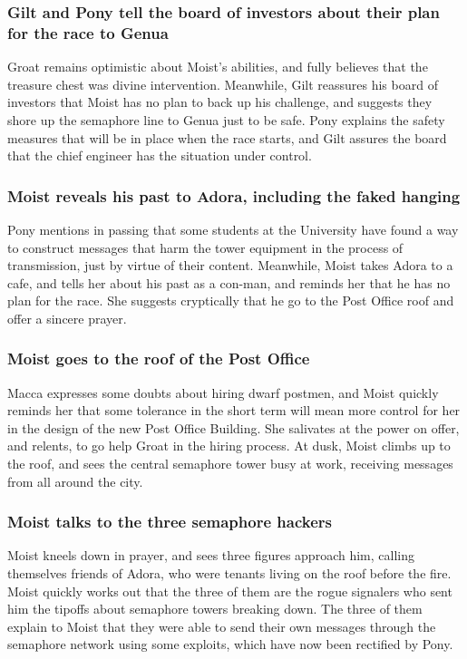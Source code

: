 \subsubsection{\Gls{Gilt} and \Gls{Pony} tell the board of investors about their plan for the race
    to Genua}
\Gls{Groat} remains optimistic about \Gls{Moist}'s abilities, and fully believes that the treasure
chest was divine intervention. Meanwhile, \Gls{Gilt} reassures his board of investors that
\Gls{Moist} has no plan to back up his challenge, and suggests they shore up the semaphore line to
Genua just to be safe. \Gls{Pony} explains the safety measures that will be in place when the race
starts, and \Gls{Gilt} assures the board that the chief engineer has the situation under control.

\subsubsection{\Gls{Moist} reveals his past to \Gls{Adora}, including the faked hanging}
\Gls{Pony} mentions in passing that some students at the University have found a way to construct
messages that harm the tower equipment in the process of transmission, just by virtue of their
content. Meanwhile, \Gls{Moist} takes \Gls{Adora} to a cafe, and tells her about his past as a
con-man, and reminds her that he has no plan for the race. She suggests cryptically that he go to
the Post Office roof and offer a sincere prayer.

\subsubsection{\Gls{Moist} goes to the roof of the Post Office}
\Gls{Macca} expresses some doubts about hiring dwarf postmen, and \Gls{Moist} quickly reminds her
that some tolerance in the short term will mean more control for her in the design of the new Post
Office Building. She salivates at the power on offer, and relents, to go help \Gls{Groat} in the
hiring process. At dusk, \Gls{Moist} climbs up to the roof, and sees the central semaphore tower
busy at work, receiving messages from all around the city.

\subsubsection{\Gls{Moist} talks to the three semaphore hackers}
\Gls{Moist} kneels down in prayer, and sees three figures approach him, calling themselves friends
of \Gls{Adora}, who were tenants living on the roof before the fire. \Gls{Moist} quickly works out
that the three of them are the rogue signalers who sent him the tipoffs about semaphore towers
breaking down. The three of them explain to \Gls{Moist} that they were able to send their own
messages through the semaphore network using some exploits, which have now been rectified by
\Gls{Pony}.

